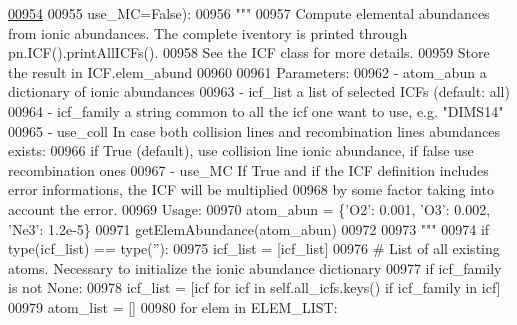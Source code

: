 \begin{DoxyCode}
\hypertarget{classpyneb_1_1core_1_1icf_1_1_i_c_f_l00954}{}\hyperlink{classpyneb_1_1core_1_1icf_1_1_i_c_f_a30b52d6d1ec148fba7c0a15cad653f61}{00954} 
00955                          use\_MC=\textcolor{keyword}{False}):
00956         \textcolor{stringliteral}{"""}
00957 \textcolor{stringliteral}{        Compute elemental abundances from ionic abundances. The complete iventory is printed through
       pn.ICF().printAllICFs().}
00958 \textcolor{stringliteral}{        See the ICF class for more details.}
00959 \textcolor{stringliteral}{        Store the result in ICF.elem\_abund}
00960 \textcolor{stringliteral}{        }
00961 \textcolor{stringliteral}{        Parameters: }
00962 \textcolor{stringliteral}{           - atom\_abun    a dictionary of ionic abundances}
00963 \textcolor{stringliteral}{           - icf\_list     a list of selected ICFs (default: all)}
00964 \textcolor{stringliteral}{           - icf\_family   a string common to all the icf one want to use, e.g. "DIMS14"}
00965 \textcolor{stringliteral}{           - use\_coll     In case both collision lines and recombination lines abundances exists:}
00966 \textcolor{stringliteral}{                           if True (default), use collision line ionic abundance, if false use
       recombination ones}
00967 \textcolor{stringliteral}{           - use\_MC       If True and if the ICF definition includes error informations, the ICF will be
       multiplied}
00968 \textcolor{stringliteral}{                           by some factor taking into account the error.}
00969 \textcolor{stringliteral}{        Usage:}
00970 \textcolor{stringliteral}{            atom\_abun = \{'O2': 0.001, 'O3': 0.002, 'Ne3': 1.2e-5\}}
00971 \textcolor{stringliteral}{            getElemAbundance(atom\_abun)}
00972 \textcolor{stringliteral}{         }
00973 \textcolor{stringliteral}{        """}
00974         \textcolor{keywordflow}{if} type(icf\_list) == type(\textcolor{stringliteral}{''}):
00975             icf\_list = [icf\_list]
00976         \textcolor{comment}{# List of all existing atoms. Necessary to initialize the ionic abundance dictionary}
00977         \textcolor{keywordflow}{if} icf\_family \textcolor{keywordflow}{is} \textcolor{keywordflow}{not} \textcolor{keywordtype}{None}:
00978             icf\_list = [icf \textcolor{keywordflow}{for} icf \textcolor{keywordflow}{in} self.all\_icfs.keys() \textcolor{keywordflow}{if} icf\_family \textcolor{keywordflow}{in} icf]
00979         atom\_list = []
00980         \textcolor{keywordflow}{for} elem \textcolor{keywordflow}{in} ELEM\_LIST:

\end{DoxyCode}
